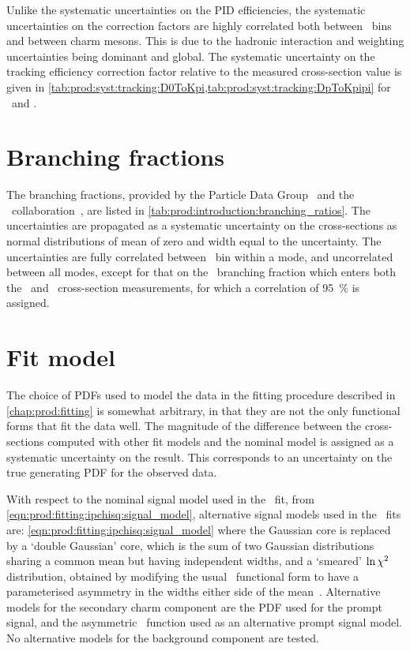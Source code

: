 Unlike the systematic uncertainties on the \ac{PID} efficiencies, the
systematic uncertainties on the correction factors are highly correlated both
between \pTy\ bins and between charm mesons.
This is due to the hadronic interaction and weighting uncertainties being
dominant and global.
The systematic uncertainty on the tracking efficiency correction factor
relative to the measured cross-section value is given in
\cref{tab:prod:syst:tracking:D0ToKpi,tab:prod:syst:tracking:DpToKpipi} for
\DzToKpi\ and \DpToKpipi.

\section{Branching fractions}
\label{chap:prod:syst:bf}

The branching fractions, provided by the Particle Data Group~\cite{PDG2014} and
the \cleo\ collaboration~\cite{Alexander:2008aa}, are listed in
\cref{tab:prod:introduction:branching_ratios}.
The uncertainties are propagated as a systematic uncertainty on the
cross-sections as normal distributions of mean of zero and width equal to the
uncertainty.
The uncertainties are fully correlated between \pTy\ bin within a mode, and
uncorrelated between all modes, except for that on the \DzToKpi\ branching
fraction which enters both the \DzToKpi\ and \DstToDzpi\ cross-section
measurements, for which a correlation of \SI{95}{\percent} is assigned.

\section{Fit model}
\label{chap:prod:syst:fitting}

The choice of \acp{PDF} used to model the data in the fitting procedure
described in \cref{chap:prod:fitting} is somewhat arbitrary, in that they are
not the only functional forms that fit the data well.
The magnitude of the difference between the cross-sections computed with other
fit models and the nominal model is assigned as a systematic uncertainty on the
result.
This corresponds to an uncertainty on the true generating \ac{PDF} for the
observed data.

With respect to the nominal signal model used in the \lnipchisq\ fit, from
\cref{eqn:prod:fitting:ipchisq:signal_model}, alternative signal models used in
the \lnipchisq\ fits are: \cref{eqn:prod:fitting:ipchisq:signal_model} where
the Gaussian core is replaced by a `double Gaussian' core, which is the sum of
two Gaussian distributions sharing a common mean but having independent widths,
and a `smeared' $\ln{\ensuremath{\chi^2}}$ distribution, obtained by modifying the usual
\chisq\ functional form to have a parameterised asymmetry in the widths either
side of the mean~\cite{LHCb-CONF-2016-010}.
Alternative models for the secondary charm component are the \ac{PDF} used for
the prompt signal, and the asymmetric \chisq\ function used as an alternative
prompt signal model.
No alternative models for the background component are tested.

